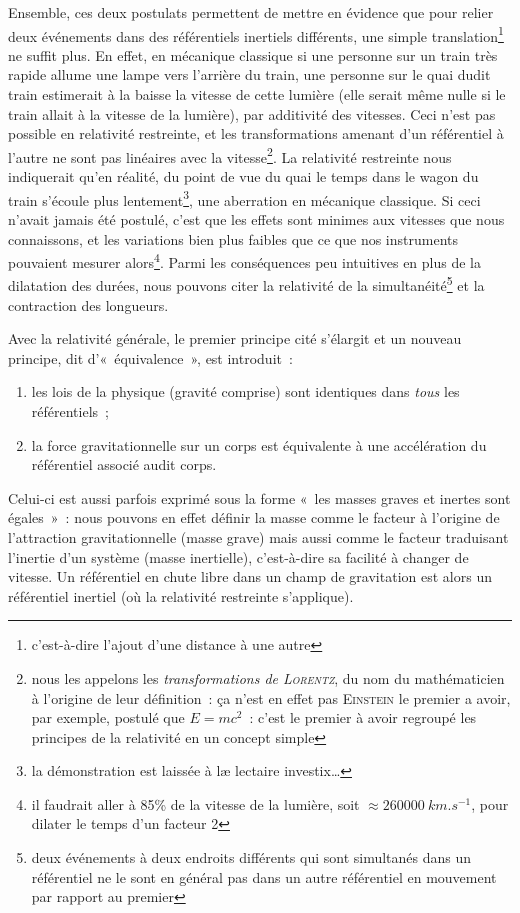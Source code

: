 \documentclass[../main/main.tex]{subfiles}
\begin{document}
Ensemble, ces deux postulats permettent de mettre en évidence que pour relier
deux événements dans des référentiels inertiels différents, une simple
translation\footnote{c'est-à-dire l'ajout d'une distance à une autre} ne suffit
plus. En effet, en mécanique classique si une personne sur un train très rapide
allume une lampe vers l'arrière du train, une personne sur le quai dudit train
estimerait à la baisse la vitesse de cette lumière (elle serait même nulle si le
train allait à la vitesse de la lumière), par additivité des vitesses. Ceci
n'est pas possible en relativité restreinte, et les transformations amenant d'un
référentiel à l'autre ne sont pas linéaires avec la vitesse\footnote{nous les
appelons les \textit{transformations de \textsc{Lorentz}}, du nom du
mathématicien à l'origine de leur définition~: ça n'est en effet pas
\textsc{Einstein} le premier a avoir, par exemple, postulé que $E = mc^2$~:
c'est le premier à avoir regroupé les principes de la relativité en un
concept simple}. La relativité restreinte nous indiquerait qu'en réalité, du
point de vue du quai le temps dans le wagon du train s'écoule plus
lentement\footnote{la démonstration est laissée à læ lectaire investix…}, une
aberration en mécanique classique. Si ceci n'avait jamais été postulé, c'est que
les effets sont minimes aux vitesses que nous connaissons, et les variations
bien plus faibles que ce que nos instruments pouvaient mesurer alors\footnote{il
faudrait aller à 85\% de la vitesse de la lumière, soit $\approx
\SI{260000}{km.s^{-1}}$, pour dilater le temps d'un facteur 2}. Parmi les
conséquences peu intuitives en plus de la dilatation des durées, nous pouvons
citer la relativité de la simultanéité\footnote{deux événements à deux endroits
    différents qui sont simultanés dans un référentiel ne le sont en général pas
dans un autre référentiel en mouvement par rapport au premier} et la contraction
des longueurs.

Avec la relativité générale, le premier principe cité s'élargit et un nouveau
principe, dit d'«~équivalence~», est introduit~:
\begin{enumerate}
    \item les lois de la physique (gravité comprise) sont identiques dans
        \textit{tous} les référentiels~;
    \item la force gravitationnelle sur un corps est équivalente à une
        accélération du référentiel associé audit corps.
\end{enumerate}
Celui-ci est aussi parfois exprimé sous la forme «~les masses graves et inertes
sont égales~»~: nous pouvons en effet définir la masse comme le facteur à
l'origine de l'attraction gravitationnelle (masse grave) mais aussi comme le
facteur traduisant l'inertie d'un système (masse inertielle), c'est-à-dire sa
facilité à changer de vitesse. Un référentiel en chute libre dans un champ de
gravitation est alors un référentiel inertiel (où la relativité restreinte
s'applique).
\end{document}
